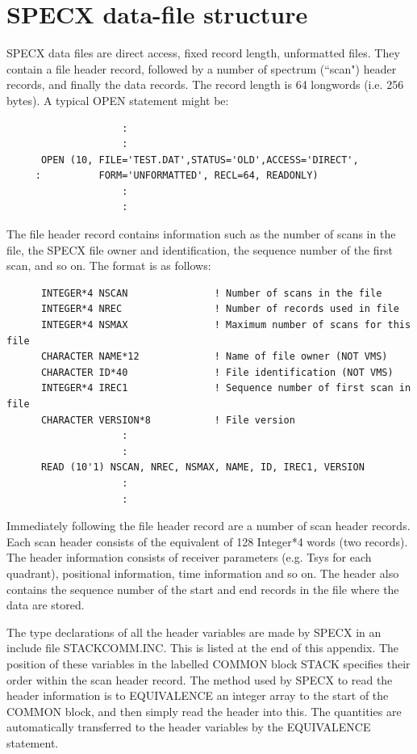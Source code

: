 \documentclass[11pt,twoside]{report}
\begin{document}
\section{SPECX data-file structure} 

SPECX data files are direct access, fixed record length, unformatted
files. They contain a file header record, followed by a number of
spectrum (``scan") header records, and finally the data records. The
record length is 64 longwords (i.e. 256 bytes). A typical OPEN
statement might be: 
\begin{verbatim}
                    :
                    :
      OPEN (10, FILE='TEST.DAT',STATUS='OLD',ACCESS='DIRECT',
     :          FORM='UNFORMATTED', RECL=64, READONLY)
                    :
                    :
\end{verbatim}

The file header record contains information such as the number of
scans in the file, the SPECX file owner and identification, the
sequence number of the first scan, and so on. The format is as
follows: 

\begin{verbatim}
      INTEGER*4 NSCAN               ! Number of scans in the file
      INTEGER*4 NREC                ! Number of records used in file
      INTEGER*4 NSMAX               ! Maximum number of scans for this file
      CHARACTER NAME*12             ! Name of file owner (NOT VMS)
      CHARACTER ID*40               ! File identification (NOT VMS)
      INTEGER*4 IREC1               ! Sequence number of first scan in file
      CHARACTER VERSION*8           ! File version
                    :
                    :
      READ (10'1) NSCAN, NREC, NSMAX, NAME, ID, IREC1, VERSION
                    :
                    :
\end{verbatim}

Immediately following the file header record are a number of scan
header records. Each scan header consists of the equivalent of 128
Integer*4 words (two records). The header information consists of
receiver parameters (e.g. Tsys for each quadrant), positional
information, time information and so on. The header also contains the
sequence number of the start and end records in the file where the
data are stored. 

The type declarations of all the header variables are made by SPECX in
an include file STACKCOMM.INC. This is listed at the end of this appendix. The
position of these variables in the labelled COMMON block STACK
specifies their order within the scan header record. The method used
by SPECX to read the header information is to EQUIVALENCE an integer
array to the start of the COMMON block, and then simply read the
header into this. The quantities are automatically transferred to the
header variables by the EQUIVALENCE statement. 
\end{document}
